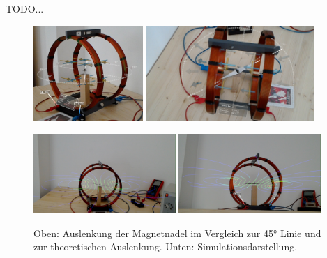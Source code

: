 TODO...\\

\begin{figure}[h!]
	\centering
	\includegraphics[width=0.37\textwidth]{images/HL/45DegCut.jpg}
	\hspace{0.01\textwidth}
	\includegraphics[width=0.57\textwidth]{images/HL/compass.jpg}
	
	\vspace{0.01\textwidth}
	
	\includegraphics[width=0.48\textwidth]{images/HL/simulation.jpg}
	\hspace{0.01\textwidth}
	\includegraphics[width=0.48\textwidth]{images/HL/simu2.jpg}
	\caption{Oben: Auslenkung der Magnetnadel im Vergleich zur 45° Linie und zur theoretischen Auslenkung. Unten: Simulationsdarstellung.}
	\label{img:hl_ss}
\end{figure}


